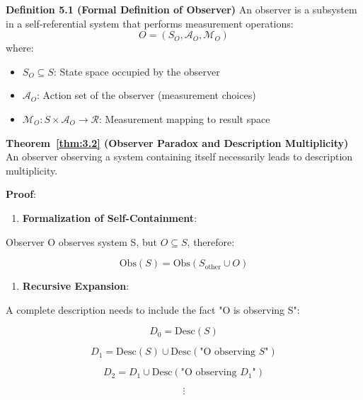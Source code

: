 \textbf{Definition 5.1 (Formal Definition of Observer)}
\label{thm:3.1}
An observer is a subsystem in a self-referential system that performs measurement operations:
\begin{equation}
O = (S_O, \mathcal{A}_O, \mathcal{M}_O)
\end{equation}
where:
\begin{itemize}
\item $S_O \subseteq S$: State space occupied by the observer
\item $\mathcal{A}_O$: Action set of the observer (measurement choices)
\item $\mathcal{M}_O: S \times \mathcal{A}_O \to \mathcal{R}$: Measurement mapping to result space
\end{itemize}

\textbf{Theorem~\ref{thm:3.2} (Observer Paradox and Description Multiplicity)}
\label{thm:3.2}
An observer observing a system containing itself necessarily leads to description multiplicity.

\textbf{Proof}:

\begin{enumerate}
\item \textbf{Formalization of Self-Containment}:
\end{enumerate}
   Observer O observes system S, but $O \subseteq S$, therefore:
   
\begin{equation}
\text{Obs}(S) = \text{Obs}(S_{\text{other}} \cup O)
\end{equation}

\begin{enumerate}
\item \textbf{Recursive Expansion}:
\end{enumerate}
   A complete description needs to include the fact "O is observing S":
   
\begin{equation}
D_0 = \text{Desc}(S)
\end{equation}
   
\begin{equation}
D_1 = \text{Desc}(S) \cup \text{Desc}(\text{"O observing } S\text{"})
\end{equation}
   
\begin{equation}
D_2 = D_1 \cup \text{Desc}(\text{"O observing } D_1\text{"})
\end{equation}
   
\begin{equation}
\vdots
\end{equation}

